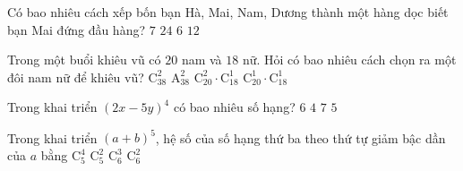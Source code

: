 \begin{ex}%
	Có bao nhiêu cách xếp bốn bạn Hà, Mai, Nam, Dương thành một hàng dọc biết bạn Mai đứng đầu hàng?
	\choice
	{$7$}
	{$24$}
	{\True $6$}
	{$12$}
\end{ex}
\begin{ex}%
	Trong một buổi khiêu vũ có $20$ nam và $18$ nữ. Hỏi có bao nhiêu cách chọn ra một đôi nam nữ để	khiêu vũ?
	\choice
	{$\mathrm{C}_{38}^2$}
	{$\mathrm{A}_{38}^2$}
	{$\mathrm{C}_{20}^2\cdot \mathrm{C}_{18}^1$}
	{\True $\mathrm{C}_{20}^1\cdot \mathrm{C}_{18}^1$}
\end{ex}
\begin{ex}%
	Trong khai triển $(2x-5y)^4$ có bao nhiêu số hạng?
	\choice
	{$6$}
	{$4$}
	{$7$}
	{\True $5$}
\end{ex}
\begin{ex}%
	Trong khai triển $(a+b)^5$, hệ số của số hạng thứ ba theo thứ tự giảm bậc dần của $a$ bằng
	\choice
	{$\mathrm{C}_5^4$}
	{\True $\mathrm{C}_5^2$}
	{$\mathrm{C}_6^3$}
	{$\mathrm{C}_6^2$}
\end{ex}

